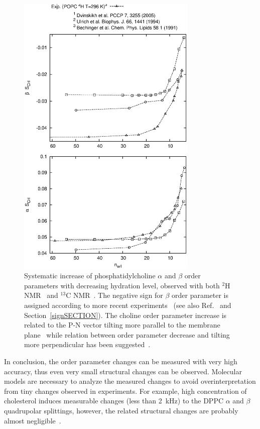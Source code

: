 \documentclass[aps,prl,superscriptaddress,twocolumn]{revtex4}
\begin{document}
\begin{figure}[]
  \includegraphics[width=8.6cm]{../Fig/OrderParameterDEHYDexp.eps}
\newline
  \caption{\label{opDEHYDeffect}
    Systematic increase of phosphatidylcholine $\alpha$ and $\beta$ order parameters with decreasing hydration level,
    observed with both $^2$H NMR~\cite{bechinger91,ulrich94} and $^{13}$C NMR~\cite{dvinskikh05b}.
    The negative sign for $\beta$ order parameter is assigned according to more recent experiments~\cite{hong95a,hong95b,gross97} 
    (see also Ref.~\cite{botan15} and Section~\ref{signSECTION}).
    The choline order parameter increase is related to the P-N vector tilting more parallel to the membrane plane~\cite{botan15}
    while relation between order parameter decrease and tilting more perpendicular has been suggested~\cite{scherer89}.
  } 
\end{figure}

In conclusion, the order parameter changes can be measured with very high accuracy,
thus even very small structural changes can be observed. Molecular models are necessary
to analyze the measured changes to avoid overinterpretation from tiny changes observed in experiments.
For example, high concentration of cholesterol induces measurable changes (less than 2~kHz) to the DPPC $\alpha$ and $\beta$ 
quadrupolar splittings, however, the related structural changes are probably almost negligible~\cite{brown78,botan15}.
\end{document}

